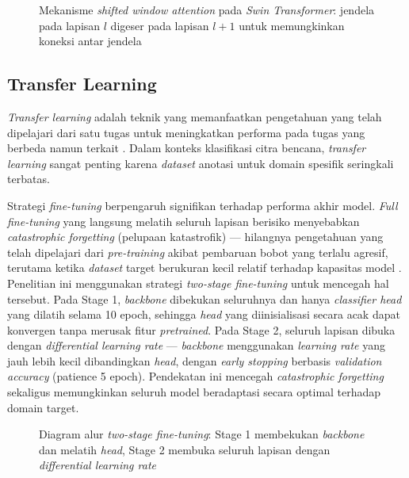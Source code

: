 \begin{figure}[h]
    \centering
    \fbox{\rule{0pt}{4cm}\rule{0.85\textwidth}{0pt}}
    \caption{Mekanisme \textit{shifted window attention} pada \textit{Swin
    Transformer}: jendela pada lapisan $l$ digeser pada lapisan $l{+}1$
    untuk memungkinkan koneksi antar jendela \cite{liu2021swin}}
    \label{fig:swin_window}
\end{figure}


\subsection{Transfer Learning} \label{II.Teori.Transfer}
\textit{Transfer learning} adalah teknik yang memanfaatkan pengetahuan
yang telah dipelajari dari satu tugas untuk meningkatkan performa pada
tugas yang berbeda namun terkait \cite{pan2010survey}. Dalam konteks
klasifikasi citra bencana, \textit{transfer learning} sangat penting
karena \textit{dataset} anotasi untuk domain spesifik seringkali
terbatas. \par

Strategi \textit{fine-tuning} berpengaruh signifikan terhadap performa
akhir model. \textit{Full fine-tuning} yang langsung melatih seluruh
lapisan berisiko menyebabkan \textit{catastrophic forgetting} (pelupaan
katastrofik) — hilangnya pengetahuan yang telah dipelajari dari
\textit{pre-training} akibat pembaruan bobot yang terlalu agresif,
terutama ketika \textit{dataset} target berukuran kecil relatif terhadap
kapasitas model \cite{kirkpatrick2017catastrophic}. Penelitian ini
menggunakan strategi \textit{two-stage fine-tuning} untuk mencegah hal
tersebut. Pada Stage 1, \textit{backbone} dibekukan seluruhnya dan
hanya \textit{classifier head} yang dilatih selama 10 epoch, sehingga
\textit{head} yang diinisialisasi secara acak dapat konvergen tanpa
merusak fitur \textit{pretrained}. Pada Stage 2, seluruh lapisan dibuka
dengan \textit{differential learning rate} — \textit{backbone}
menggunakan \textit{learning rate} yang jauh lebih kecil dibandingkan
\textit{head}, dengan \textit{early stopping} berbasis \textit{validation
accuracy} (patience 5 epoch). Pendekatan ini mencegah \textit{catastrophic
forgetting} sekaligus memungkinkan seluruh model beradaptasi secara
optimal terhadap domain target. \par

\begin{figure}[h]
    \centering
    \fbox{\rule{0pt}{4cm}\rule{0.85\textwidth}{0pt}}
    \caption{Diagram alur \textit{two-stage fine-tuning}: Stage 1
    membekukan \textit{backbone} dan melatih \textit{head}, Stage 2
    membuka seluruh lapisan dengan \textit{differential learning rate}}
    \label{fig:two_stage_finetuning}
\end{figure}


